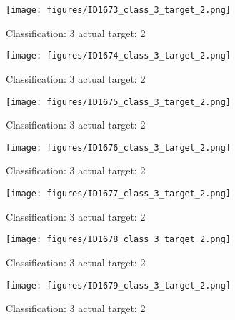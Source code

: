 \begin{figure}[h!]
\begin{center}
\texttt{[image: figures/ID1673\_class\_3\_target\_2.png]}
\end{center}
\caption{ Classification: 3 actual target: 2}
\label{fig:ID1673_class_3_target_2}
\end{figure}
\begin{figure}[h!]
\begin{center}
\texttt{[image: figures/ID1674\_class\_3\_target\_2.png]}
\end{center}
\caption{ Classification: 3 actual target: 2}
\label{fig:ID1674_class_3_target_2}
\end{figure}
\begin{figure}[h!]
\begin{center}
\texttt{[image: figures/ID1675\_class\_3\_target\_2.png]}
\end{center}
\caption{ Classification: 3 actual target: 2}
\label{fig:ID1675_class_3_target_2}
\end{figure}
\begin{figure}[h!]
\begin{center}
\texttt{[image: figures/ID1676\_class\_3\_target\_2.png]}
\end{center}
\caption{ Classification: 3 actual target: 2}
\label{fig:ID1676_class_3_target_2}
\end{figure}
\begin{figure}[h!]
\begin{center}
\texttt{[image: figures/ID1677\_class\_3\_target\_2.png]}
\end{center}
\caption{ Classification: 3 actual target: 2}
\label{fig:ID1677_class_3_target_2}
\end{figure}
\begin{figure}[h!]
\begin{center}
\texttt{[image: figures/ID1678\_class\_3\_target\_2.png]}
\end{center}
\caption{ Classification: 3 actual target: 2}
\label{fig:ID1678_class_3_target_2}
\end{figure}
\begin{figure}[h!]
\begin{center}
\texttt{[image: figures/ID1679\_class\_3\_target\_2.png]}
\end{center}
\caption{ Classification: 3 actual target: 2}
\label{fig:ID1679_class_3_target_2}
\end{figure}

